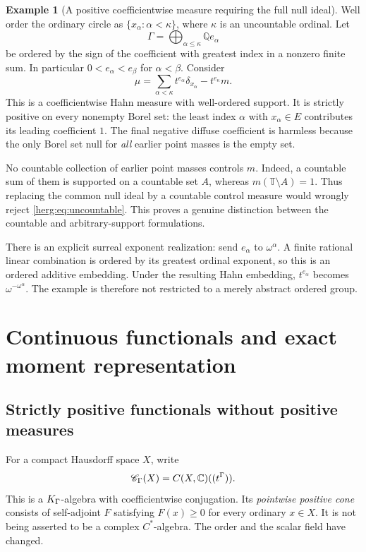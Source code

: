 \documentclass[11pt,letterpaper]{article}
\theoremstyle{definition}
\newtheorem{example}[theorem]{Example}
\newcommand{\Q}{\mathbb Q}\newcommand{\T}{\mathbb T}
\newcommand{\CH}{\mathscr C_\Gamma}
\numberwithin{equation}{section}
\begin{document}
\begin{example}[A positive coefficientwise measure requiring the full null ideal]\label{herg:ex:uncountable}
Well order the ordinary circle as $\{x_\alpha:\alpha<\kappa\}$, where $\kappa$ is an uncountable ordinal. Let
\[
 \Gamma=\bigoplus_{\alpha\le\kappa}\Q e_\alpha
\]
be ordered by the sign of the coefficient with greatest index in a nonzero finite sum. In particular $0<e_\alpha<e_\beta$ for $\alpha<\beta$. Consider
\begin{equation}\label{herg:eq:uncountable}
 \mu=\sum_{\alpha<\kappa}t^{e_\alpha}\delta_{x_\alpha}
       -t^{e_\kappa}m.
\end{equation}
This is a coefficientwise Hahn measure with well-ordered support. It is strictly positive on every nonempty Borel set: the least index $\alpha$ with $x_\alpha\in E$ contributes its leading coefficient $1$. The final negative diffuse coefficient is harmless because the only Borel set null for \emph{all} earlier point masses is the empty set.

No countable collection of earlier point masses controls $m$. Indeed, a countable sum of them is supported on a countable set $A$, whereas $m(\T\setminus A)=1$. Thus replacing the common null ideal by a countable control measure would wrongly reject \eqref{herg:eq:uncountable}. This proves a genuine distinction between the countable and arbitrary-support formulations.

There is an explicit surreal exponent realization: send $e_\alpha$ to $\omega^\alpha$. A finite rational linear combination is ordered by its greatest ordinal exponent, so this is an ordered additive embedding. Under the resulting Hahn embedding, $t^{e_\alpha}$ becomes $\omega^{-\omega^\alpha}$. The example is therefore not restricted to a merely abstract ordered group.
\end{example}

\section{Continuous functionals and exact moment representation}
\label{herg:sec:representation}

\subsection{Strictly positive functionals without positive measures}

For a compact Hausdorff space $X$, write
\[
 \CH(X)=C(X,\C)((t^\Gamma)).
\]
This is a $K_\Gamma$-algebra with coefficientwise conjugation. Its \emph{pointwise positive cone} consists of self-adjoint $F$ satisfying $F(x)\ge0$ for every ordinary $x\in X$. It is not being asserted to be a complex $C^*$-algebra. The order and the scalar field have changed.
\end{document}
